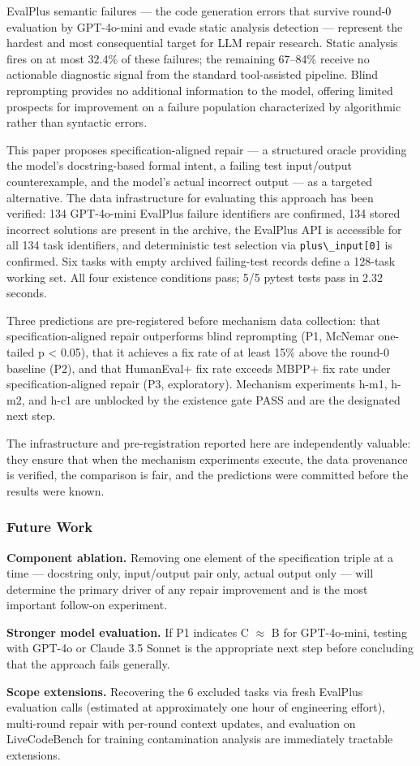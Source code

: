 
EvalPlus semantic failures --- the code generation errors that survive round-0 evaluation by GPT-4o-mini and evade static analysis detection --- represent the hardest and most consequential target for LLM repair research. Static analysis fires on at most 32.4\% of these failures; the remaining 67--84\% receive no actionable diagnostic signal from the standard tool-assisted pipeline. Blind reprompting provides no additional information to the model, offering limited prospects for improvement on a failure population characterized by algorithmic rather than syntactic errors.

This paper proposes specification-aligned repair --- a structured oracle providing the model's docstring-based formal intent, a failing test input/output counterexample, and the model's actual incorrect output --- as a targeted alternative. The data infrastructure for evaluating this approach has been verified: 134 GPT-4o-mini EvalPlus failure identifiers are confirmed, 134 stored incorrect solutions are present in the archive, the EvalPlus API is accessible for all 134 task identifiers, and deterministic test selection via \texttt{plus\textbackslash \_input[0]} is confirmed. Six tasks with empty archived failing-test records define a 128-task working set. All four existence conditions pass; 5/5 pytest tests pass in 2.32 seconds.

Three predictions are pre-registered before mechanism data collection: that specification-aligned repair outperforms blind reprompting (P1, McNemar one-tailed p < 0.05), that it achieves a fix rate of at least 15\% above the round-0 baseline (P2), and that HumanEval+ fix rate exceeds MBPP+ fix rate under specification-aligned repair (P3, exploratory). Mechanism experiments h-m1, h-m2, and h-c1 are unblocked by the existence gate PASS and are the designated next step.

The infrastructure and pre-registration reported here are independently valuable: they ensure that when the mechanism experiments execute, the data provenance is verified, the comparison is fair, and the predictions were committed before the results were known.

\subsubsection{Future Work}

\textbf{Component ablation.} Removing one element of the specification triple at a time --- docstring only, input/output pair only, actual output only --- will determine the primary driver of any repair improvement and is the most important follow-on experiment.

\textbf{Stronger model evaluation.} If P1 indicates C $\approx$ B for GPT-4o-mini, testing with GPT-4o or Claude 3.5 Sonnet is the appropriate next step before concluding that the approach fails generally.

\textbf{Scope extensions.} Recovering the 6 excluded tasks via fresh EvalPlus evaluation calls (estimated at approximately one hour of engineering effort), multi-round repair with per-round context updates, and evaluation on LiveCodeBench for training contamination analysis are immediately tractable extensions.

